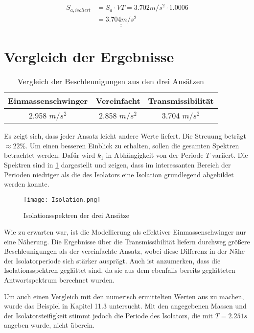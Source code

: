 \begin{align*}
S_{a,isoliert} &= S_a \cdot VT = 3.702 m/s^2 \cdot 1.0006\\
               &= \underline{\underline{3.704 m/s^2}}
\end{align*}

\section{Vergleich der Ergebnisse}

\begin{table}[H]
\centering
\begin{tabular}{ |c|c|c| } 
 \hline
 Einmassenschwinger & Vereinfacht & Transmissibilität\\
 \hline\hline
 2.958 $m/s^2$ & 2.858 $m/s^2$ & 3.704 $m/s^2$\\
 \hline
\end{tabular}
\caption{Vergleich der Beschleunigungen aus den drei Ansätzen}
\end{table}

Es zeigt sich, dass jeder Ansatz leicht andere Werte liefert. Die Streuung beträgt $\approx 22\%$. 
Um einen besseren Einblick zu erhalten, sollen die gesamten Spektren betrachtet werden. Dafür wird $k_1$ in Abhängigkeit von der Periode $T$ variiert. Die Spektren sind in \cref{fig:Isolation} dargestellt und zeigen, dass im interessanten Bereich der Perioden niedriger als die des Isolators eine Isolation grundlegend abgebildet werden konnte.

\begin{figure}[H]
    \centering
    \texttt{[image: Isolation.png]}
    \caption{Isolationsspektren der drei Ansätze}
    \label{fig:Isolation}
\end{figure}

Wie zu erwarten war, ist die Modellierung als effektiver Einmassenschwinger nur eine Näherung. Die Ergebnisse über die Transmissibilität liefern durchweg größere Beschleunigungen als der vereinfachte Ansatz, wobei diese Differenz in der Nähe der Isolatorperiode sich stärker ausprägt. Auch ist anzumerken, dass die Isolationsspektren geglättet sind, da sie aus dem ebenfalls bereits geglätteten Antwortspektrum berechnet wurden.

Um auch einen Vergleich mit den numerisch ermittelten Werten aus \cite{Isemann} zu machen, wurde das Beispiel in Kapitel 11.3 untersucht.
Mit den angegebenen Massen und der Isolatorsteifigkeit stimmt jedoch die Periode des Isolators, die mit $T = 2.251 s$ angeben wurde, nicht überein.

